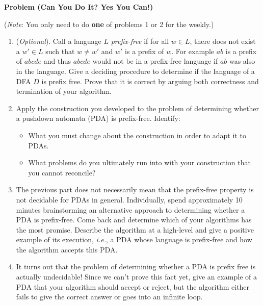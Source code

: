 \documentclass[12pt]{article}
\newcommand{\ie}{\emph{i.e.}\xspace}
\newcommand{\note}[1]{(\emph{Note}: #1)}
\newcounter{ProblemCounter}
\newenvironment{problem}[1][]
  {\refstepcounter{ProblemCounter}\noindent\textbf{Problem \theProblemCounter{} (#1)}\quad}
  {\newpage}
\newcommand{\answerbelow}{\noindent\makebox[\linewidth]{\rule{\textwidth}{0.4pt}}}
\begin{document}
\begin{problem}[Can You Do It?  Yes You Can!]

\begin{center}
  \note{You only need to do \textbf{one} of problems 1 or 2 for the weekly.}
\end{center}

\begin{enumerate}[label=(\alph*)]
  \item (\emph{Optional}).  Call a language \( L \) \emph{prefix-free} if for
    all \( w \in L \), there does not exist a \( w' \in L \) such that \( w
    \neq w' \) and \( w' \) is a prefix of \( w \). For example \( ab \) is a
    prefix of \( abcde \) and thus \( abcde \) would not be in a prefix-free
    language if \( ab \) was also in the language.  Give a deciding procedure
    to determine if the language of a DFA \( D \) is prefix free. Prove that it
    is correct by arguing both correctness and termination of your algorithm.
  \item Apply the construction you developed to the problem of determining
    whether a pushdown automata (PDA) is prefix-free.  Identify:
    \begin{itemize}
      \item What you must change about the construction in order to adapt it
        to PDAs.
      \item What problems do you ultimately run into with your construction
      that you cannot reconcile?
    \end{itemize}
  \item The previous part does not necessarily mean that the prefix-free
    property is not decidable for PDAs in general.  Individually, spend
    approximately 10 minutes brainstorming an alternative approach to
    determining whether a PDA is prefix-free.  Come back and determine which of
    your algorithms has the most promise.  Describe the algorithm at a
    high-level and give a positive example of its execution, \ie, a PDA whose
    language is prefix-free and how the algorithm accepts this PDA.
  \item It turns out that the problem of determining whether a PDA is prefix
    free is actually undecidable! Since we can't prove this fact yet, give an
    example of a PDA that your algorithm should accept or reject, but the
    algorithm either fails to give the correct answer or goes into an infinite
    loop.
\end{enumerate}

\answerbelow{}


\end{problem}
\end{document}
